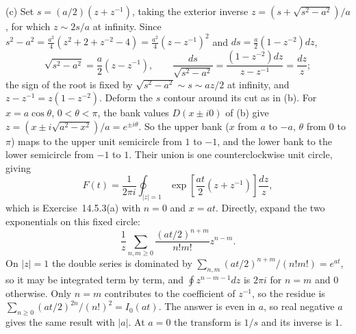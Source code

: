 (c) Set $s=(a/2)(z+z^{-1})$, taking the exterior inverse
$z=(s+\sqrt{s^2-a^2})/a$, for which $z\sim2s/a$ at infinity.
Since $s^2-a^2=\frac{a^2}4(z^2+2+z^{-2}-4)
=\frac{a^2}4(z-z^{-1})^2$ and $ds=\frac a2(1-z^{-2})dz$,
\[
\sqrt{s^2-a^2}=\frac a2(z-z^{-1}),\qquad
\frac{ds}{\sqrt{s^2-a^2}}
=\frac{(1-z^{-2})dz}{z-z^{-1}}=\frac{dz}{z};
\]
the sign of the root is fixed by $\sqrt{s^2-a^2}\sim s\sim az/2$
at infinity, and $z-z^{-1}=z(1-z^{-2})$. Deform the $s$
contour around its cut as in (b). For $x=a\cos\theta$,
$0<\theta<\pi$, the bank values $D(x\pm i0)$ of (b) give
$z=(x\pm i\sqrt{a^2-x^2})/a=e^{\pm i\theta}$. So the upper
bank ($x$ from $a$ to $-a$, $\theta$ from $0$ to $\pi$) maps to
the upper unit semicircle from $1$ to $-1$,
and the lower bank to the lower semicircle from $-1$ to $1$.
Their union is one counterclockwise unit circle, giving
\[
F(t)=\frac1{2\pi i}\oint_{|z|=1}
\exp\left[\frac{at}{2}(z+z^{-1})\right]\frac{dz}{z},
\]
which is Exercise~14.5.3(a) with $n=0$ and $x=at$. Directly,
expand the two exponentials on this fixed circle:
\[
\frac1z\sum_{n,m\ge0}
\frac{(at/2)^{n+m}}{n!m!}z^{n-m}.
\]
On $|z|=1$ the double series is dominated by
$\sum_{n,m}(at/2)^{n+m}/(n!m!)=e^{at}$, so it may be integrated
term by term, and $\oint z^{n-m-1}dz$ is $2\pi i$ for $n=m$ and
$0$ otherwise. Only $n=m$ contributes to the coefficient of
$z^{-1}$, so the residue is
$\sum_{n\ge0}(at/2)^{2n}/(n!)^2=I_0(at)$.
The answer is even in $a$, so real negative $a$ gives the
same result with $|a|$. At $a=0$ the transform is $1/s$ and
its inverse is $1$.

